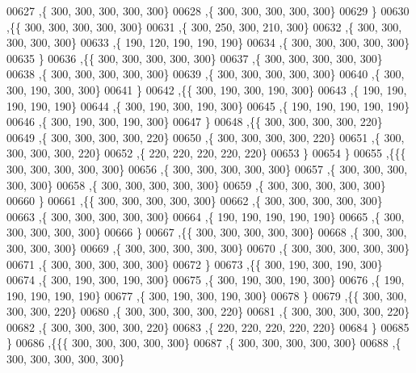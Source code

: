 \begin{DoxyCode}
00627    ,\{   300,   300,   300,   300,   300\}
00628    ,\{   300,   300,   300,   300,   300\}
00629    \}
00630   ,\{\{   300,   300,   300,   300,   300\}
00631    ,\{   300,   250,   300,   210,   300\}
00632    ,\{   300,   300,   300,   300,   300\}
00633    ,\{   190,   120,   190,   190,   190\}
00634    ,\{   300,   300,   300,   300,   300\}
00635    \}
00636   ,\{\{   300,   300,   300,   300,   300\}
00637    ,\{   300,   300,   300,   300,   300\}
00638    ,\{   300,   300,   300,   300,   300\}
00639    ,\{   300,   300,   300,   300,   300\}
00640    ,\{   300,   300,   190,   300,   300\}
00641    \}
00642   ,\{\{   300,   190,   300,   190,   300\}
00643    ,\{   190,   190,   190,   190,   190\}
00644    ,\{   300,   190,   300,   190,   300\}
00645    ,\{   190,   190,   190,   190,   190\}
00646    ,\{   300,   190,   300,   190,   300\}
00647    \}
00648   ,\{\{   300,   300,   300,   300,   220\}
00649    ,\{   300,   300,   300,   300,   220\}
00650    ,\{   300,   300,   300,   300,   220\}
00651    ,\{   300,   300,   300,   300,   220\}
00652    ,\{   220,   220,   220,   220,   220\}
00653    \}
00654   \}
00655  ,\{\{\{   300,   300,   300,   300,   300\}
00656    ,\{   300,   300,   300,   300,   300\}
00657    ,\{   300,   300,   300,   300,   300\}
00658    ,\{   300,   300,   300,   300,   300\}
00659    ,\{   300,   300,   300,   300,   300\}
00660    \}
00661   ,\{\{   300,   300,   300,   300,   300\}
00662    ,\{   300,   300,   300,   300,   300\}
00663    ,\{   300,   300,   300,   300,   300\}
00664    ,\{   190,   190,   190,   190,   190\}
00665    ,\{   300,   300,   300,   300,   300\}
00666    \}
00667   ,\{\{   300,   300,   300,   300,   300\}
00668    ,\{   300,   300,   300,   300,   300\}
00669    ,\{   300,   300,   300,   300,   300\}
00670    ,\{   300,   300,   300,   300,   300\}
00671    ,\{   300,   300,   300,   300,   300\}
00672    \}
00673   ,\{\{   300,   190,   300,   190,   300\}
00674    ,\{   300,   190,   300,   190,   300\}
00675    ,\{   300,   190,   300,   190,   300\}
00676    ,\{   190,   190,   190,   190,   190\}
00677    ,\{   300,   190,   300,   190,   300\}
00678    \}
00679   ,\{\{   300,   300,   300,   300,   220\}
00680    ,\{   300,   300,   300,   300,   220\}
00681    ,\{   300,   300,   300,   300,   220\}
00682    ,\{   300,   300,   300,   300,   220\}
00683    ,\{   220,   220,   220,   220,   220\}
00684    \}
00685   \}
00686  ,\{\{\{   300,   300,   300,   300,   300\}
00687    ,\{   300,   300,   300,   300,   300\}
00688    ,\{   300,   300,   300,   300,   300\}

\end{DoxyCode}
